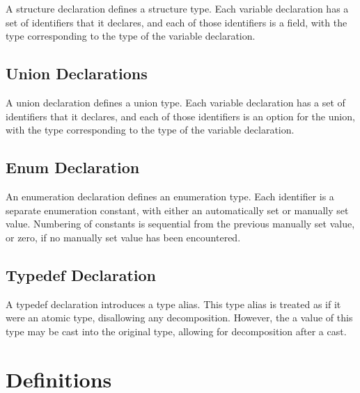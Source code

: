 \documentclass[letterpaper,12pt]{book}
\begin{document}


A structure declaration defines a structure type. Each variable declaration has a set of identifiers that it declares, and each of those identifiers is a field, with the type corresponding to the type of the variable declaration.

\section{Union Declarations}



A union declaration defines a union type. Each variable declaration has a set of identifiers that it declares, and each of those identifiers is an option for the union, with the type corresponding to the type of the variable declaration.

\section{Enum Declaration}



An enumeration declaration defines an enumeration type. Each identifier is a separate enumeration constant, with either an automatically set or manually set value. Numbering of constants is sequential from the previous manually set value, or zero, if no manually set value has been encountered.

\section{Typedef Declaration}



A typedef declaration introduces a type alias. This type alias is treated as if it were an atomic type, disallowing any decomposition. However, the a value of this type may be cast into the original type, allowing for decomposition after a cast.

\chapter{Definitions}
\end{document}
